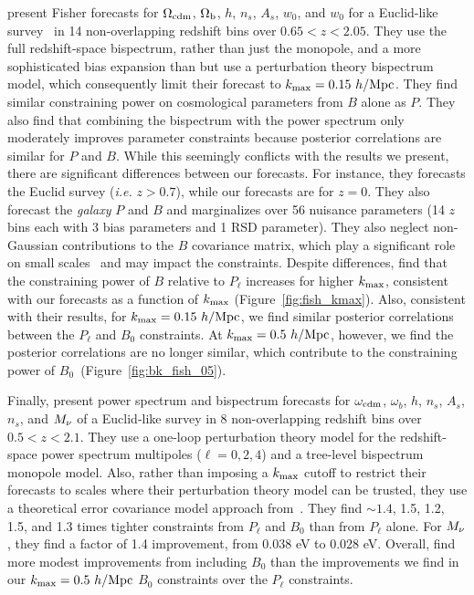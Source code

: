 \cite{yankelevich2019} present Fisher forecasts for $\Omega_{\rm cdm}$, 
$\Omega_{\rm b}$, $h$, $n_s$, $A_s$, $w_0$, and $w_0$ for a 
Euclid-like survey~\citep{laureijs2011} in 14 non-overlapping redshift 
bins over $0.65 < z < 2.05$. They use the full redshift-space bispectrum,
rather than just the monopole, and a more sophisticated bias expansion 
than \cite{sefusatti2006} but use a perturbation theory bispectrum model, 
which consequently limit their forecast to $k_{\rm max} = 0.15~h/{\rm Mpc}$. 
They find similar constraining power on cosmological parameters from $B$ 
alone as $P$. They also find that combining the bispectrum with the power 
spectrum only moderately improves parameter constraints because posterior 
correlations are similar for $P$ and $B$. While this seemingly conflicts 
with the results we present, there are significant differences between our 
forecasts. For instance, they forecasts the Euclid survey 
(\emph{i.e.} $z > 0.7$), while our forecasts are for $z = 0$.
They also forecast the {\em galaxy} $P$ and $B$ and marginalizes over 
56 nuisance parameters (14 $z$ bins each with 3 bias parameters and 1 
RSD parameter). They also neglect non-Gaussian contributions to the $B$ 
covariance matrix, which play a significant role on small scales~\citep{chan2017} 
and may impact the constraints.  %
Despite differences, \cite{yankelevich2019} find that the constraining 
power of $B$ relative to $P_\ell$ increases for higher $k_{\rm max}$, consistent 
with our forecasts as a function of $k_{\rm max}$ (Figure~\ref{fig:fish_kmax}). 
Also, consistent with their results, for $k_{\rm max} = 0.15~h/{\rm Mpc}$, 
we find similar posterior correlations between the $P_\ell$ and $B_0$ 
constraints. At $k_{\rm max} = 0.5~h/{\rm Mpc}$, however, we find the posterior 
correlations are no longer similar, which contribute to the constraining
power of $B_0$~(Figure~\ref{fig:bk_fish_05}).

Finally, \cite{chudaykin2019} present power spectrum and bispectrum 
forecasts for $\omega_{\rm cdm}$, $\omega_b$, $h$, $n_s$, $A_s$, $n_s$, 
and $M_\nu$ of a Euclid-like survey in 8 non-overlapping redshift bins 
over $0.5 < z < 2.1$. They use
a one-loop perturbation theory model for the redshift-space  power spectrum
multipoles ($\ell = 0, 2, 4$) and a tree-level bispectrum monopole model. 
Also, rather than imposing a $k_{\rm max}$ cutoff to restrict their 
forecasts to scales where their perturbation theory model can be trusted, 
they use a theoretical error covariance model approach from~\cite{baldauf2016}.%
They find ${\sim}1.4$, 1.5, 1.2, 1.5, and 1.3 times tighter constraints 
from $P_\ell$ and $B_0$ than from $P_\ell$ alone. For $M_\nu$, they find 
a factor of 1.4 improvement, from 0.038 eV to 0.028 eV. Overall, 
\cite{chudaykin2019} find more modest improvements from including $B_0$ than 
the improvements we find in our $k_{\rm max} = 0.5~h/{\rm Mpc}$ $B_0$ constraints 
over the $P_\ell$ constraints. 

